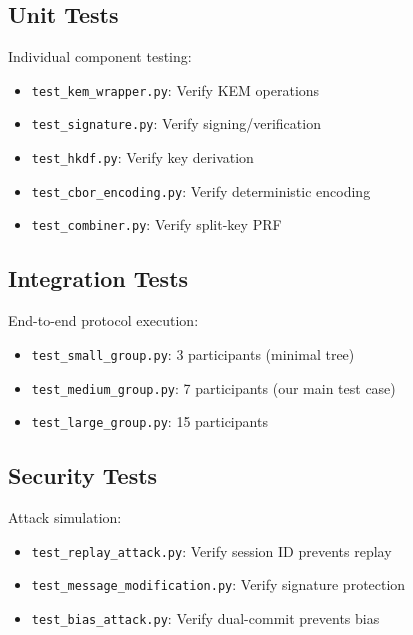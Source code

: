 \documentclass[12pt,a4paper]{report}
\begin{document}
\subsection{Unit Tests}

Individual component testing:

\begin{itemize}
\item \texttt{test\_kem\_wrapper.py}: Verify KEM operations
\item \texttt{test\_signature.py}: Verify signing/verification
\item \texttt{test\_hkdf.py}: Verify key derivation
\item \texttt{test\_cbor\_encoding.py}: Verify deterministic encoding
\item \texttt{test\_combiner.py}: Verify split-key PRF
\end{itemize}

\subsection{Integration Tests}

End-to-end protocol execution:

\begin{itemize}
\item \texttt{test\_small\_group.py}: 3 participants (minimal tree)
\item \texttt{test\_medium\_group.py}: 7 participants (our main test case)
\item \texttt{test\_large\_group.py}: 15 participants
\end{itemize}

\subsection{Security Tests}

Attack simulation:

\begin{itemize}
\item \texttt{test\_replay\_attack.py}: Verify session ID prevents replay
\item \texttt{test\_message\_modification.py}: Verify signature protection
\item \texttt{test\_bias\_attack.py}: Verify dual-commit prevents bias
\end{itemize}

\end{document}
